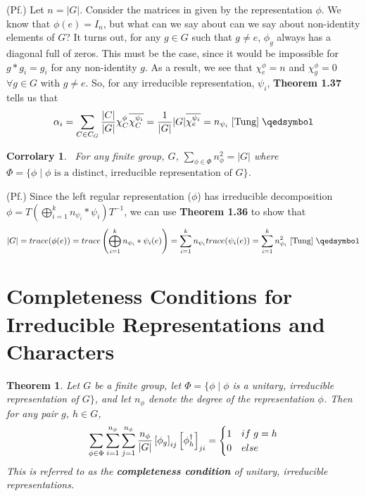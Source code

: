 \documentclass[10pt]{ucthesis}
\newtheorem{theorem}[definition]{Theorem}
\newtheorem{corrolary}[definition]{Corrolary}
\begin{document}
\noindent(Pf.) Let $n=|G|$. Consider the matrices in given by the representation $\phi$. We know that $\phi(e) = I_n$, but what can we say about can we say about non-identity elements of $G$? It turns out, for any $g\in G$ such that $g\neq e$, $\phi_g$ always has a diagonal full of zeros. This must be the case, since it would be impossible for $g *g_i = g_i$  for any non-identity $g$. As a result, we see that $\chi^\phi_e = n$ and $\chi^\phi_g = 0$ $\forall g \in G$ with $g \neq e$. So, for any irreducible representation, $\psi_i$, \textbf{Theorem 1.37} tells us that 
\begin{equation}
	\begin{aligned}
		\alpha_i = \sum_{C\in C_G} \frac{|C|}{|G|} \chi^\phi_C \overline{\chi_C^{\psi_i}} = \frac{1}{|G|}|G| \overline{\chi_e^{\psi_i}} = n_{\psi_i} \hspace{1mm}\cite{Tung} \hspace{1mm}\qedsymbol
	\end{aligned}
\end{equation}

\begin{corrolary}
\	For any finite group, $G$, $\sum_{\phi \in \Phi} n_\phi^2 = |G|$ where $\Phi=\{\phi \mid \phi \text{ is a distinct, irreducible representation of }G\}$.
\end{corrolary}

\noindent(Pf.) Since the left regular representation ($\phi$) has irreducible decomposition $\phi = T\left(\bigoplus_{i=1}^k n_{\psi_i}*\psi_i\right)T^{-1}$, we can use \textbf{Theorem 1.36} to show that
\begin{equation}
	\begin{aligned}
		|G| = trace(\phi(e)) = trace\left(\bigoplus_{i=1}^k n_{\psi_i}*\psi_i(e)\right) = \sum_{i=1}^k n_{\psi_i}trace(\psi_i(e)) = \sum_{i=1}^k n_{\psi_i}^2 \hspace{1mm}\cite{Tung} \hspace{1mm} \qedsymbol
	\end{aligned}
\end{equation}

\section{Completeness Conditions for Irreducible Representations and Characters}


\begin{theorem}
	Let $G$ be a finite group, let $\Phi = \{\phi \mid \phi$ is a unitary, irreducible representation of $G\}$, and let $n_\phi$ denote the degree of the representation $\phi$. Then for any pair $g$, $h \in G$, 
$$\sum_{\phi \in \Phi} \sum_{i=1}^{n_\phi} \sum_{j=1}^{n_\phi} \frac{n_\phi}{|G|} \left[\phi_g\right]_{ij}\left[\phi_{h}^\dag\right]_{ji} = \begin{cases}
																										1 & if \hspace{1mm} g = h \\
																										0 & else
																									\end{cases}$$
This is referred to as the \textbf{completeness condition} of unitary, irreducible representations.
\end{theorem}
\end{document}
